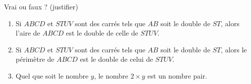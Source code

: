 
\begin{exercice}\label{exo2smath-0324}

    Vrai ou faux ? (justifier)
    \begin{enumerate}
        \item
            Si \( ABCD\) et \( STUV\) sont des carrés tels que \( AB\) soit le double de \( ST\), alors l'aire de \( ABCD\) est le double de celle de \( STUV\).
        \item
            Si \( ABCD\) et \( STUV\) sont des carrés tels que \( AB\) soit le double de \( ST\), alors le périmètre de \( ABCD\) est le double de celui de \( STUV\).
        \item
            Quel que soit le nombre \( y\), le nombre \( 2\times y\)  est un nombre pair.
    \end{enumerate}

\end{exercice}
